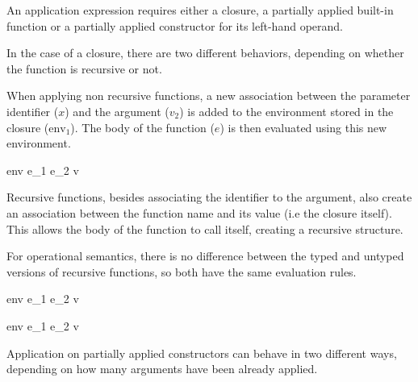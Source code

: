\documentclass{article}
\begin{document}
An application expression requires either a closure, a partially applied built-in function or a partially applied constructor for its left-hand operand.

\smallskip

In the case of a closure, there are two different behaviors, depending on whether the function is recursive or not.

When applying non recursive functions, a new association between the parameter identifier ($x$) and the argument ($v_2$) is added to the environment stored in the closure ($\mbox{env}_1$).
The body of the function ($e$) is then evaluated using this new environment.

    {\mbox{env} \vdash e_1 \; e_2 \Downarrow v}

Recursive functions, besides associating the identifier to the argument, also create an association between the function name and its value (i.e the closure itself).
This allows the body of the function to call itself, creating a recursive structure.

For operational semantics, there is no difference between the typed and untyped versions of recursive functions, so both have the same evaluation rules.

    {\mbox{env} \vdash e_1 \; e_2 \Downarrow v}

    {\mbox{env} \vdash e_1 \; e_2 \Downarrow v}

\medskip

Application on partially applied constructors can behave in two different ways, depending on how many arguments have been already applied.
\end{document}
